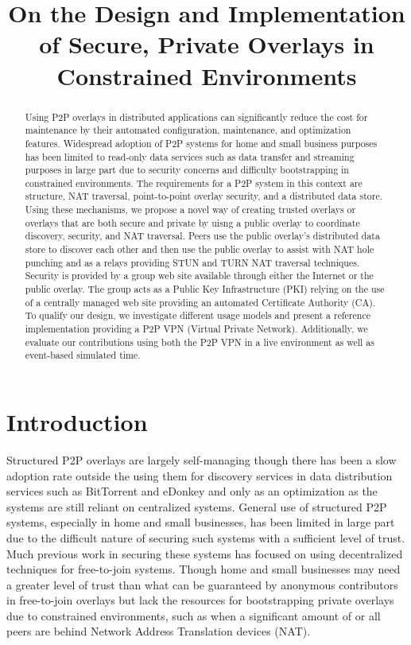 \documentclass[conference]{IEEEtran}
\begin{document}
\title{On the Design and Implementation of Secure, Private Overlays in
Constrained Environments}

\author{ 
}

\maketitle

\begin{abstract}
Using P2P overlays in distributed applications can significantly reduce the
cost for maintenance by their automated configuration, maintenance, and
optimization features.  Widespread adoption of P2P systems for home and small
business purposes has been limited to read-only data services such as data
transfer and streaming purposes in large part due to security concerns and
difficulty bootstrapping in constrained environments.  The requirements for
a P2P system in this context are structure, NAT traversal, point-to-point overlay
security, and a distributed data store.  Using these mechanisms, we propose
a novel way of creating trusted overlays or overlays that are both secure and
private by uisng a public overlay to coordinate discovery, security, and NAT
traversal.  Peers use the public overlay's distributed data store to discover
each other and then use the public overlay to assist with NAT hole punching
and as a relays providing STUN and TURN NAT traversal techniques.  Security is
provided by a group web site available through either the Internet or the
public overlay.  The group acts as a Public Key Infrastructure (PKI) relying on
the use of a centrally managed web site providing an automated Certificate
Authority (CA).  To qualify our design, we investigate different usage models
and present a reference implementation providing a P2P VPN (Virtual Private
Network).  Additionally, we evaluate our contributions using both the P2P VPN
in a live environment as well as event-based simulated time.
\end{abstract}
\section{Introduction}
Structured P2P overlays are largely self-managing though there has been a slow
adoption rate outside the using them for discovery services in data distribution
services such as BitTorrent and eDonkey and only as an optimization as the
systems are still reliant on centralized systems.  General use of structured
P2P systems, especially in home and small businesses, has been limited in large
part due to the difficult nature of securing such systems with a sufficient level
of trust.  Much previous work in securing these systems has focused on using
decentralized techniques for free-to-join systems.  Though home and small
businesses may need a greater level of trust than what can be guaranteed by
anonymous contributors in free-to-join overlays but lack the resources for
bootstrapping private overlays due to constrained environments, such as when a
significant amount of or all peers are behind Network Address Translation
devices (NAT).
\end{document}

